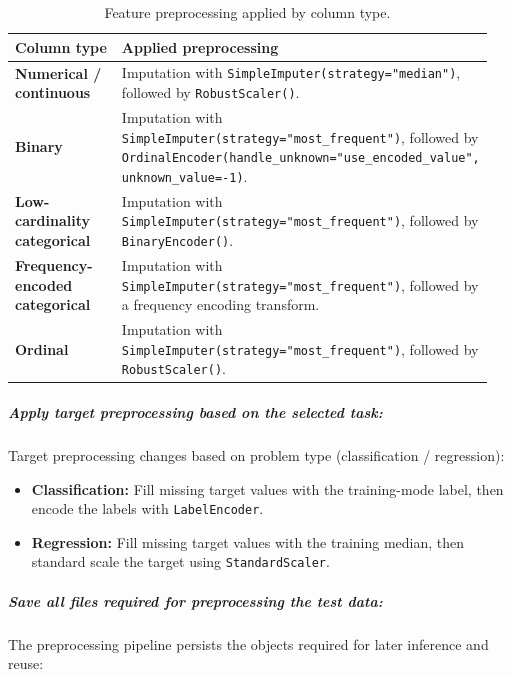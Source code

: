 \begin{table}[H]
\centering
\caption{Feature preprocessing applied by column type.}
\begin{tabular}{p{0.30\linewidth}p{0.65\linewidth}}
\toprule
\textbf{Column type} & \textbf{Applied preprocessing}\\
\midrule
\textbf{Numerical / continuous} & Imputation with \texttt{SimpleImputer(strategy="median")}, followed by \texttt{RobustScaler()}.\\
\textbf{Binary} & Imputation with \texttt{SimpleImputer(strategy="most\_frequent")}, followed by \texttt{OrdinalEncoder(handle\_unknown="use\_encoded\_value", unknown\_value=-1)}.\\
\textbf{Low-cardinality categorical} & Imputation with \texttt{SimpleImputer(strategy="most\_frequent")}, followed by \texttt{BinaryEncoder()}.\\
\textbf{Frequency-encoded categorical} & Imputation with \texttt{SimpleImputer(strategy="most\_frequent")}, followed by a frequency encoding transform.\\
\textbf{Ordinal} & Imputation with \texttt{SimpleImputer(strategy="most\_frequent")}, followed by \texttt{RobustScaler()}.\\
\bottomrule
\end{tabular}
\end{table}

\subparagraph{Apply target preprocessing based on the selected task:}
Target preprocessing changes based on problem type (classification / regression):

\begin{itemize}
  \item \textbf{Classification:} Fill missing target values with the training-mode label, then encode the labels with \texttt{LabelEncoder}.
  \item \textbf{Regression:} Fill missing target values with the training median, then standard scale the target using \texttt{StandardScaler}. 
\end{itemize}



\subparagraph{Save all files required for preprocessing the test data:}
The preprocessing pipeline persists the objects required for later inference and reuse:

